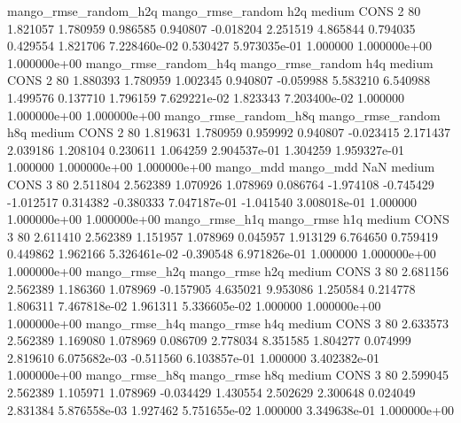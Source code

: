 mango_rmse_random_h2q mango_rmse_random                  h2q     medium     CONS                 2 80  1.821057       1.780959 0.986585       0.940807   -0.018204      2.251519      4.865844     0.794035       0.429554  1.821706 7.228460e-02     0.530427   5.973035e-01            1.000000    1.000000e+00        1.000000e+00
mango_rmse_random_h4q mango_rmse_random                  h4q     medium     CONS                 2 80  1.880393       1.780959 1.002345       0.940807   -0.059988      5.583210      6.540988     1.499576       0.137710  1.796159 7.629221e-02     1.823343   7.203400e-02            1.000000    1.000000e+00        1.000000e+00
mango_rmse_random_h8q mango_rmse_random                  h8q     medium     CONS                 2 80  1.819631       1.780959 0.959992       0.940807   -0.023415      2.171437      2.039186     1.208104       0.230611  1.064259 2.904537e-01     1.304259   1.959327e-01            1.000000    1.000000e+00        1.000000e+00
            mango_mdd         mango_mdd                  NaN     medium     CONS                 3 80  2.511804       2.562389 1.070926       1.078969    0.086764     -1.974108     -0.745429    -1.012517       0.314382 -0.380333 7.047187e-01    -1.041540   3.008018e-01            1.000000    1.000000e+00        1.000000e+00
       mango_rmse_h1q        mango_rmse                  h1q     medium     CONS                 3 80  2.611410       2.562389 1.151957       1.078969    0.045957      1.913129      6.764650     0.759419       0.449862  1.962166 5.326461e-02    -0.390548   6.971826e-01            1.000000    1.000000e+00        1.000000e+00
       mango_rmse_h2q        mango_rmse                  h2q     medium     CONS                 3 80  2.681156       2.562389 1.186360       1.078969   -0.157905      4.635021      9.953086     1.250584       0.214778  1.806311 7.467818e-02     1.961311   5.336605e-02            1.000000    1.000000e+00        1.000000e+00
       mango_rmse_h4q        mango_rmse                  h4q     medium     CONS                 3 80  2.633573       2.562389 1.169080       1.078969    0.086709      2.778034      8.351585     1.804277       0.074999  2.819610 6.075682e-03    -0.511560   6.103857e-01            1.000000    3.402382e-01        1.000000e+00
       mango_rmse_h8q        mango_rmse                  h8q     medium     CONS                 3 80  2.599045       2.562389 1.105971       1.078969   -0.034429      1.430554      2.502629     2.300648       0.024049  2.831384 5.876558e-03     1.927462   5.751655e-02            1.000000    3.349638e-01        1.000000e+00
